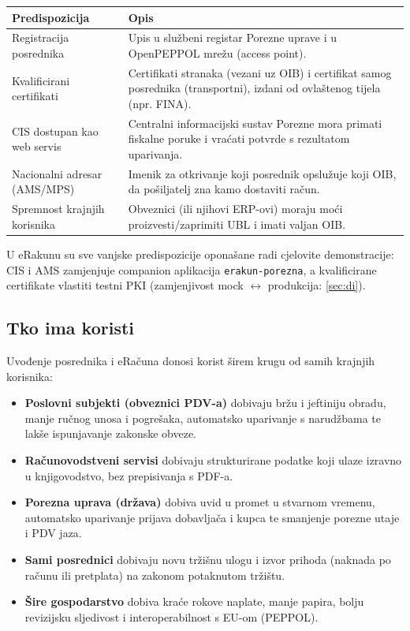 \documentclass[11pt,a4paper]{article}
\renewenvironment{leftbar}{%
  \def\FrameCommand{\hspace{0pt}\vrule width 2pt\hspace{8pt}}%
  \MakeFramed{\advance\hsize-\width \FrameRestore}}%
 {\endMakeFramed}
\begin{document}
\begin{tabularx}{\textwidth}{@{}lY@{}}
\toprule
\textbf{Predispozicija} & \textbf{Opis} \\
\midrule
Registracija posrednika & Upis u službeni registar Porezne uprave i u OpenPEPPOL mrežu (access point). \\
Kvalificirani certifikati & Certifikati stranaka (vezani uz OIB) i certifikat samog posrednika (transportni), izdani od ovlaštenog tijela (npr. FINA). \\
CIS dostupan kao web servis & Centralni informacijski sustav Porezne mora primati fiskalne poruke i vraćati potvrde s rezultatom uparivanja. \\
Nacionalni adresar (AMS/MPS) & Imenik za otkrivanje koji posrednik opslužuje koji OIB, da pošiljatelj zna kamo dostaviti račun. \\
Spremnost krajnjih korisnika & Obveznici (ili njihovi ERP-ovi) moraju moći proizvesti/zaprimiti UBL i imati valjan OIB. \\
\bottomrule
\end{tabularx}

\begin{leftbar}
U eRakunu su sve vanjske predispozicije oponašane radi cjelovite demonstracije:
CIS i AMS zamjenjuje companion aplikacija \texttt{erakun-porezna}, a kvalificirane certifikate
vlastiti testni PKI (zamjenjivost mock $\leftrightarrow$ produkcija: \ref{sec:di}).
\end{leftbar}

\subsection{Tko ima koristi}

Uvođenje posrednika i eRačuna donosi korist širem krugu od samih krajnjih korisnika:

\begin{itemize}[nosep]
  \item \textbf{Poslovni subjekti (obveznici PDV-a)} dobivaju bržu i jeftiniju obradu, manje ručnog
        unosa i pogrešaka, automatsko uparivanje s narudžbama te lakše ispunjavanje zakonske obveze.
  \item \textbf{Računovodstveni servisi} dobivaju strukturirane podatke koji ulaze izravno u
        knjigovodstvo, bez prepisivanja s PDF-a.
  \item \textbf{Porezna uprava (država)} dobiva uvid u promet u stvarnom vremenu, automatsko
        uparivanje prijava dobavljača i kupca te smanjenje porezne utaje i PDV jaza.
  \item \textbf{Sami posrednici} dobivaju novu tržišnu ulogu i izvor prihoda (naknada po računu
        ili pretplata) na zakonom potaknutom tržištu.
  \item \textbf{Šire gospodarstvo} dobiva kraće rokove naplate, manje papira, bolju revizijsku
        sljedivost i interoperabilnost s EU-om (PEPPOL).
\end{itemize}
\end{document}
